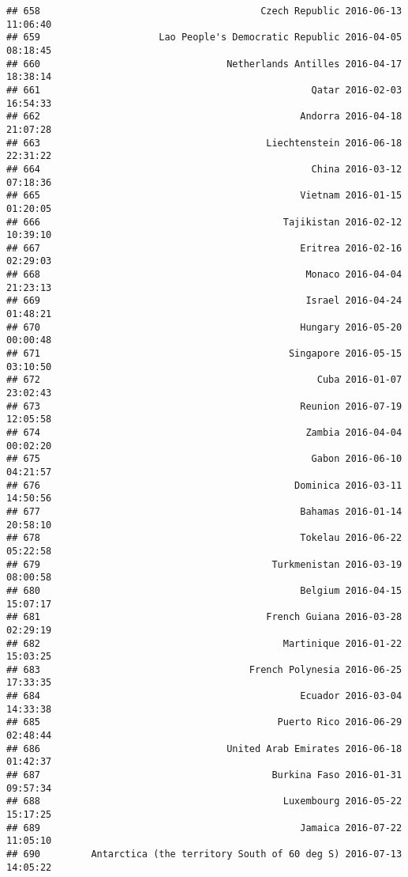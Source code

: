 \documentclass[
]{article}
\begin{document}
\begin{verbatim}
## 658                                       Czech Republic 2016-06-13 11:06:40
## 659                     Lao People's Democratic Republic 2016-04-05 08:18:45
## 660                                 Netherlands Antilles 2016-04-17 18:38:14
## 661                                                Qatar 2016-02-03 16:54:33
## 662                                              Andorra 2016-04-18 21:07:28
## 663                                        Liechtenstein 2016-06-18 22:31:22
## 664                                                China 2016-03-12 07:18:36
## 665                                              Vietnam 2016-01-15 01:20:05
## 666                                           Tajikistan 2016-02-12 10:39:10
## 667                                              Eritrea 2016-02-16 02:29:03
## 668                                               Monaco 2016-04-04 21:23:13
## 669                                               Israel 2016-04-24 01:48:21
## 670                                              Hungary 2016-05-20 00:00:48
## 671                                            Singapore 2016-05-15 03:10:50
## 672                                                 Cuba 2016-01-07 23:02:43
## 673                                              Reunion 2016-07-19 12:05:58
## 674                                               Zambia 2016-04-04 00:02:20
## 675                                                Gabon 2016-06-10 04:21:57
## 676                                             Dominica 2016-03-11 14:50:56
## 677                                              Bahamas 2016-01-14 20:58:10
## 678                                              Tokelau 2016-06-22 05:22:58
## 679                                         Turkmenistan 2016-03-19 08:00:58
## 680                                              Belgium 2016-04-15 15:07:17
## 681                                        French Guiana 2016-03-28 02:29:19
## 682                                           Martinique 2016-01-22 15:03:25
## 683                                     French Polynesia 2016-06-25 17:33:35
## 684                                              Ecuador 2016-03-04 14:33:38
## 685                                          Puerto Rico 2016-06-29 02:48:44
## 686                                 United Arab Emirates 2016-06-18 01:42:37
## 687                                         Burkina Faso 2016-01-31 09:57:34
## 688                                           Luxembourg 2016-05-22 15:17:25
## 689                                              Jamaica 2016-07-22 11:05:10
## 690         Antarctica (the territory South of 60 deg S) 2016-07-13 14:05:22

\end{verbatim}
\end{document}
